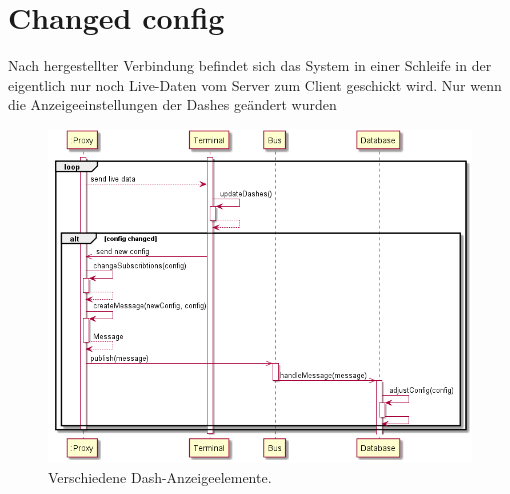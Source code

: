 \documentclass[entwurf.tex]{subfiles}
\begin{document}
  	\section{Changed config}
  		Nach hergestellter Verbindung befindet sich das System in einer Schleife in der eigentlich nur noch Live-Daten vom Server zum Client geschickt wird. Nur wenn die Anzeigeeinstellungen der Dashes geändert wurden 
  		\begin{figure}[H]
  			\begin{center}
 				\includegraphics[width=\textwidth]{diagrams/ChangeDashConfig.png}
  				\caption{Verschiedene Dash-Anzeigeelemente.}
  			\end{center}
  		\end{figure}
  		
  	
\end{document}
